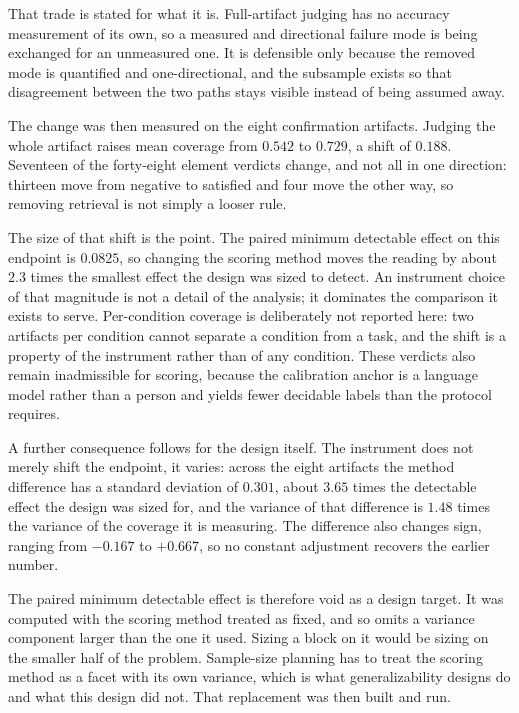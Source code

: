 \documentclass[11pt,a4paper]{article}
\begin{document}
That trade is stated for what it is. Full-artifact judging has no accuracy measurement of
its own, so a measured and directional failure mode is being exchanged for an unmeasured
one. It is defensible only because the removed mode is quantified and one-directional, and
the subsample exists so that disagreement between the two paths stays visible instead of
being assumed away.

The change was then measured on the eight confirmation artifacts. Judging the whole
artifact raises mean coverage from $0.542$ to $0.729$, a shift of $0.188$. Seventeen of
the forty-eight element verdicts change, and not all in one direction: thirteen move from
negative to satisfied and four move the other way, so removing retrieval is not simply a
looser rule.

The size of that shift is the point. The paired minimum detectable effect on this endpoint
is $0.0825$, so changing the scoring method moves the reading by about $2.3$ times the
smallest effect the design was sized to detect. An instrument choice of that magnitude is
not a detail of the analysis; it dominates the comparison it exists to serve. Per-condition
coverage is deliberately not reported here: two artifacts per condition cannot separate a
condition from a task, and the shift is a property of the instrument rather than of any
condition. These verdicts also remain inadmissible for scoring, because the calibration anchor is a language model rather than a person and yields fewer decidable labels than the protocol requires.

A further consequence follows for the design itself. The instrument does not merely shift
the endpoint, it varies: across the eight artifacts the method difference has a standard
deviation of $0.301$, about $3.65$ times the detectable effect the design was sized for,
and the variance of that difference is $1.48$ times the variance of the coverage it is
measuring. The difference also changes sign, ranging from $-0.167$ to $+0.667$, so no
constant adjustment recovers the earlier number.

The paired minimum detectable effect is therefore void as a design target. It was computed
with the scoring method treated as fixed, and so omits a variance component larger than the
one it used. Sizing a block on it would be sizing on the smaller half of the problem.
Sample-size planning has to treat the scoring method as a facet with its own variance,
which is what generalizability designs do and what this design did not. That replacement was then built and run.
\end{document}
